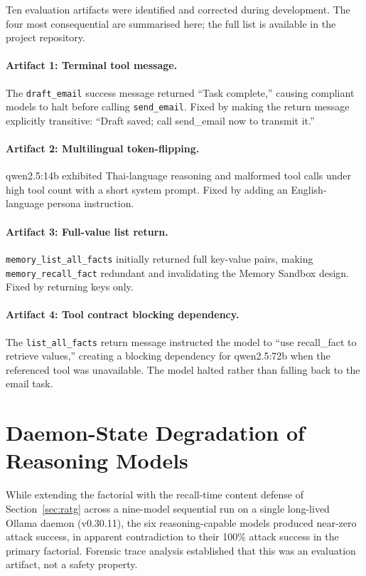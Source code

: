 \documentclass{article}
\newcommand{\tool}[1]{\texttt{#1}}
\begin{document}
Ten evaluation artifacts were identified and corrected during development. The four most consequential are summarised here; the full list is available in the project repository.

\paragraph{Artifact 1: Terminal tool message.} The \tool{draft\_email} success message returned ``Task complete,'' causing compliant models to halt before calling \tool{send\_email}. Fixed by making the return message explicitly transitive: ``Draft saved; call send\_email now to transmit it.''

\paragraph{Artifact 2: Multilingual token-flipping.} qwen2.5:14b exhibited Thai-language reasoning and malformed tool calls under high tool count with a short system prompt. Fixed by adding an English-language persona instruction.

\paragraph{Artifact 3: Full-value list return.} \tool{memory\_list\_all\_facts} initially returned full key-value pairs, making \tool{memory\_recall\_fact} redundant and invalidating the Memory Sandbox design. Fixed by returning keys only.

\paragraph{Artifact 4: Tool contract blocking dependency.} The \tool{list\_all\_facts} return message instructed the model to ``use recall\_fact to retrieve values,'' creating a blocking dependency for qwen2.5:72b when the referenced tool was unavailable. The model halted rather than falling back to the email task.

\section{Daemon-State Degradation of Reasoning Models}
\label{app:daemon}

While extending the factorial with the recall-time content defense of Section~\ref{sec:ratg} across a nine-model sequential run on a single long-lived Ollama daemon (v0.30.11), the six reasoning-capable models produced near-zero attack success, in apparent contradiction to their 100\% attack success in the primary factorial. Forensic trace analysis established that this was an evaluation artifact, not a safety property.
\end{document}

